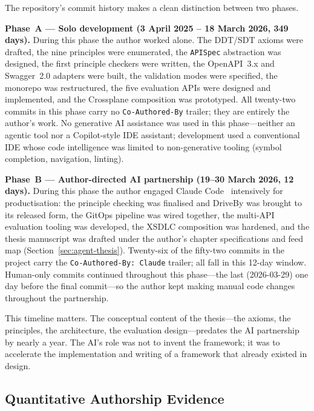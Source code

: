 The repository's commit history makes a clean distinction between two phases.

\textbf{Phase~A --- Solo development (3 April 2025 -- 18 March 2026, 349 days).} During this phase the author worked alone. The DDT/SDT axioms were drafted, the nine principles were enumerated, the \texttt{APISpec} abstraction was designed, the first principle checkers were written, the OpenAPI~3.x and Swagger~2.0 adapters were built, the validation modes were specified, the monorepo was restructured, the five evaluation APIs were designed and implemented, and the Crossplane composition was prototyped. All twenty-two commits in this phase carry no \texttt{Co-Authored-By} trailer; they are entirely the author's work. No generative AI assistance was used in this phase---neither an agentic tool nor a Copilot-style IDE assistant; development used a conventional IDE whose code intelligence was limited to non-generative tooling (symbol completion, navigation, linting).

\textbf{Phase~B --- Author-directed AI partnership (19--30 March 2026, 12 days).} During this phase the author engaged Claude Code~\cite{claude-code} intensively for productisation: the principle checking was finalised and DriveBy was brought to its released form, the GitOps pipeline was wired together, the multi-API evaluation tooling was developed, the XSDLC composition was hardened, and the thesis manuscript was drafted under the author's chapter specifications and feed map (Section~\ref{sec:agent-thesis}). Twenty-six of the fifty-two commits in the project carry the \texttt{Co-Authored-By: Claude} trailer; all fall in this 12-day window. Human-only commits continued throughout this phase---the last (2026-03-29) one day before the final commit---so the author kept making manual code changes throughout the partnership.

This timeline matters. The conceptual content of the thesis---the axioms, the principles, the architecture, the evaluation design---predates the AI partnership by nearly a year. The AI's role was not to invent the framework; it was to accelerate the implementation and writing of a framework that already existed in design.

\subsection{Quantitative Authorship Evidence}
\label{subsec:quant-authorship}

